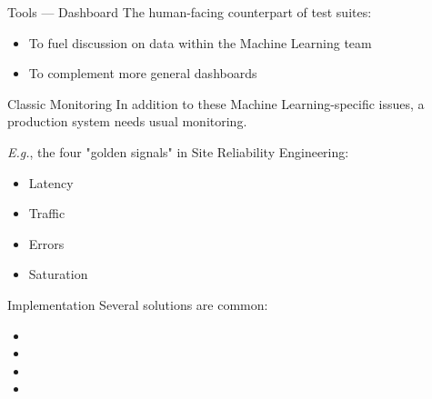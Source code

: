\begin{frame}{Tools — Dashboard}
  The human-facing counterpart of test suites:
  
  \begin{itemize}
    \item To fuel discussion on data within the Machine Learning team
    \item To complement more general dashboards
  \end{itemize}
\end{frame}

\begin{frame}{Classic Monitoring}
  In addition to these Machine Learning-specific issues, a production system needs usual monitoring.

  \textit{E.g.}, the four "golden signals" in Site Reliability Engineering:
  
  \begin{itemize}
    \item Latency
    \item Traffic
    \item Errors
    \item Saturation
  \end{itemize}
\end{frame}

\begin{frame}{Implementation}
  Several solutions are common:
  
  \begin{itemize}
    \item {}
    \item {}
    \item {}
    \item {}
  \end{itemize}
\end{frame}
